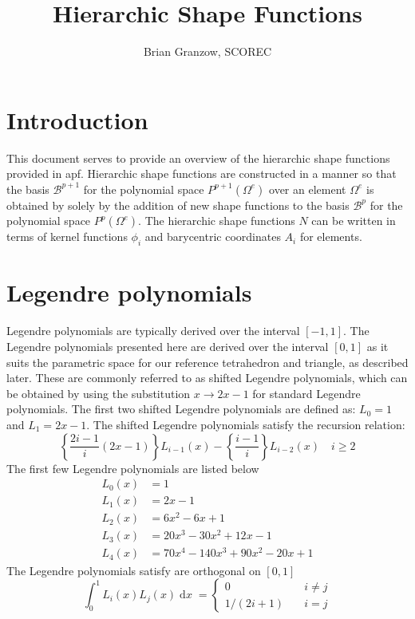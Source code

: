 \documentclass{article}
\title{Hierarchic Shape Functions}
\author{Brian Granzow, SCOREC}
\begin{document}
\maketitle

\section{Introduction}

This document serves to provide an overview of the hierarchic shape functions
provided in apf. Hierarchic shape functions are constructed in a manner so that
the basis $\mathcal{B}^{p+1}$ for the polynomial space $P^{p+1}(\Omega^e)$
over an element $\Omega^e$ is obtained by solely by the addition of new shape
functions to the basis $\mathcal{B}^p$ for the polynomial space
$P^p(\Omega^e)$. The hierarchic shape functions $N$ can be written in terms
of kernel functions $\phi_i$ and barycentric coordinates $A_i$ for elements.

\section{Legendre polynomials}

Legendre polynomials are typically derived over the interval $[-1,1]$. The
Legendre polynomials presented here are derived over the interval $[0,1]$
as it suits the parametric space for our reference tetrahedron and triangle,
as described later. These are commonly referred to as shifted Legendre
polynomials, which can be obtained by using the substitution $x \to 2x - 1$ for
standard Legendre polynomials. The first two shifted Legendre polynomials are
defined as: $L_0 = 1$ and $L_1 = 2x - 1$. The shifted Legendre polynomials
satisfy the recursion relation:
\[
\left\{ \frac{2i-1}{i} (2x-1)\right \} L_{i-1}(x) -
\left\{ \frac{i-1}{i} \right \} L_{i-2}(x) \quad i \geq 2
\]
The first few Legendre polynomials are listed below
\begin{align*}
L_0(x) &= 1 \\
L_1(x) &= 2x - 1 \\
L_2(x) &= 6x^2 - 6x + 1 \\
L_3(x) &= 20x^3 - 30x^2 + 12x - 1 \\
L_4(x) & = 70x^4 - 140x^3 + 90x^2 - 20x + 1
\end{align*}
The Legendre polynomials satisfy are orthogonal on $[0,1]$
\[
\int _0 ^1 L_i(x) L_j(x) \; \text{d}x \; =
\begin{cases}
0 &\quad i \neq j \\
1/(2i+1) &\quad i = j
\end{cases}
\]
\end{document}
